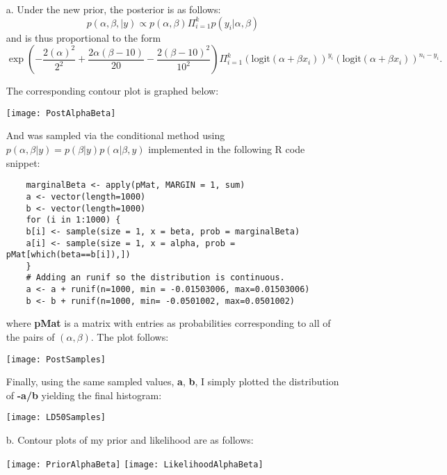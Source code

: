 \documentclass[12pt]{article}
\begin{document}
\begin{enumerate}
	\item[a.] Under the new prior, the posterior is as follows:
	\begin{displaymath}
	p(\alpha, \beta, | y) \propto p(\alpha,\beta) \Pi_{i=1}^k p(y_i | \alpha, \beta)
	\end{displaymath}
	and is thus proportional to the form
	\begin{displaymath}
	\exp\left(- \frac{2(\alpha)^2}{2^2}+\frac{2\alpha(\beta-10)}{20}-\frac{2(\beta-10)^2}{10^2} \right) \Pi_{i=1}^k (\text{logit}(\alpha+\beta x_i))^{y_i} (\text{logit}(\alpha+\beta x_i))^{n_i-y_i}.
	\end{displaymath}
	
	The corresponding contour plot is graphed below:
	
	\vspace{1cm}
	\begin{center}
		\texttt{[image: PostAlphaBeta]}
	\end{center}
	
	And was sampled via the conditional method using $p(\alpha,\beta | y)=p(\beta | y)p(\alpha | \beta , y)$ implemented in the following R code snippet:
	\begin{Verbatim}
	marginalBeta <- apply(pMat, MARGIN = 1, sum)
	a <- vector(length=1000)
	b <- vector(length=1000)
	for (i in 1:1000) {
	b[i] <- sample(size = 1, x = beta, prob = marginalBeta)
	a[i] <- sample(size = 1, x = alpha, prob = pMat[which(beta==b[i]),])
	}
	# Adding an runif so the distribution is continuous.
	a <- a + runif(n=1000, min = -0.01503006, max=0.01503006)
	b <- b + runif(n=1000, min= -0.0501002, max=0.0501002)
	\end{Verbatim}
	where \textbf{pMat} is a matrix with entries as probabilities corresponding to all of the pairs of $(\alpha, \beta)$. The plot follows:
	\vspace{1cm}
	\begin{center}
		\texttt{[image: PostSamples]}
	\end{center}
	
	Finally, using the same sampled values, \textbf{a}, \textbf{b}, I simply plotted the distribution of \textbf{-a/b} yielding the final histogram:
	\begin{center}
		\texttt{[image: LD50Samples]}
	\end{center}
	\item[b.] Contour plots of my prior and likelihood are as follows:
	\begin{center}
		\texttt{[image: PriorAlphaBeta]}
		\vspace{1cm}
		\texttt{[image: LikelihoodAlphaBeta]}
	\end{center}
			

\end{enumerate}
\end{document}
